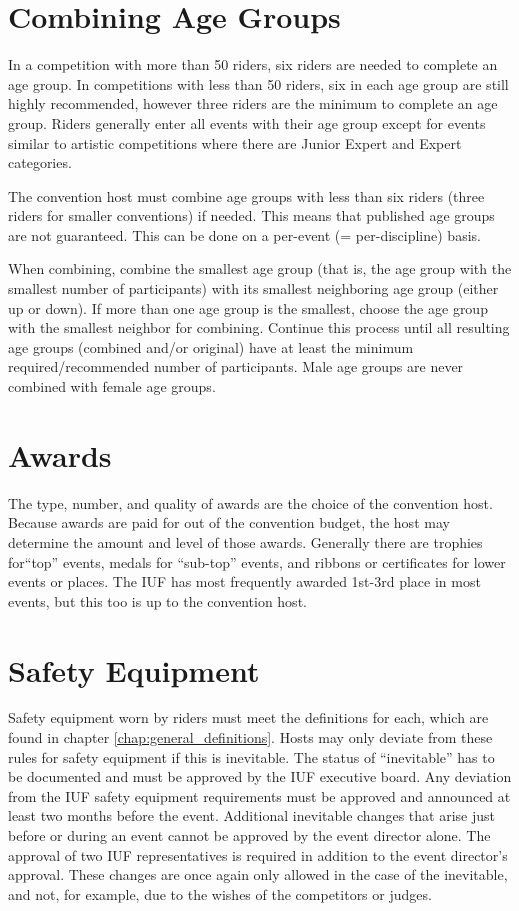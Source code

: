 \section{Combining Age Groups \label{subsec:general_host's-option-unicon_combining-age-groups}}

In a competition with more than 50 riders, six riders are needed to complete an age group.
In competitions with less than 50 riders, six in each age group are still highly recommended, however three riders are the minimum to complete an age group.
Riders generally enter all events with their age group except for events similar to artistic competitions where there are Junior Expert and Expert categories.

The convention host must combine age groups with less than six riders (three riders for smaller conventions) if needed.
This means that published age groups are not guaranteed.
This can be done on a per-event (= per-discipline) basis.

When combining, combine the smallest age group (that is, the age group with the smallest number of participants) with its smallest neighboring age group (either up or down).
If more than one age group is the smallest, choose the age group with the smallest neighbor for combining.
Continue this process until all resulting age groups (combined and/or original) have at least the minimum required/recommended number of participants.
Male age groups are never combined with female age groups.

\section{Awards}

The type, number, and quality of awards are the choice of the convention host. 
Because awards are paid for out of the convention budget, the host may determine the amount and level of those awards. 
Generally there are trophies for``top'' events, medals for ``sub-top'' events, and ribbons or certificates for lower events or places. 
The IUF has most frequently awarded 1st-3rd place in most events, but this too is up to the convention host.

\section{Safety Equipment}

Safety equipment worn by riders must meet the definitions for each, which are found in chapter \ref{chap:general_definitions}.
Hosts may only deviate from these rules for safety equipment if this is inevitable.
The status of ``inevitable'' has to be documented and must be approved by the IUF executive board. 
Any deviation from the IUF safety equipment requirements must be approved and announced at least two months before the event.
Additional inevitable changes that arise just before or during an event cannot be approved by the event director alone.
The approval of two IUF representatives is required in addition to the event director's approval.
These changes are once again only allowed in the case of the inevitable, and not, for example, due to the wishes of the competitors or judges.

